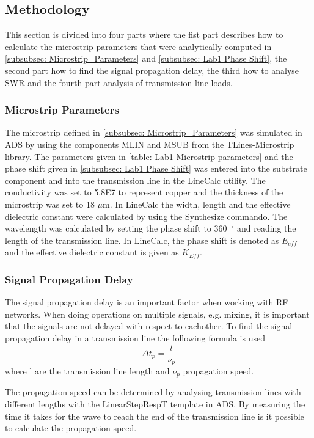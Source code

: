 \documentclass[report.tex]{subfiles}
\begin{document}
\subsection{Methodology}\label{sec:Lab1 methodology}
This section is divided into four parts where the fist part describes how to calculate the microstrip parameters that were analytically computed in \ref{subsubsec: Microstrip_Parameters} and \ref{subsubsec: Lab1 Phase Shift}, the second part how to find the signal propagation delay, the third how to analyse SWR and the fourth part analysis of transmission line loads.

\subsubsection{Microstrip Parameters}
The microstrip defined in \ref{subsubsec: Microstrip_Parameters} was simulated in ADS by using the components MLIN and MSUB from the TLines-Microstrip library. The parameters given in \ref{table: Lab1 Microstrip parameters} and the phase shift given in \ref{subsubsec: Lab1 Phase Shift} was entered into the substrate component and into the transmission line in the LineCalc utility. The conductivity was set to 5.8E7 to represent copper and the thickness of the microstrip was set to 18 $\mu$m. In LineCalc the width, length and the effective dielectric constant were calculated by using the Synthesize commando. The wavelength was calculated by setting the phase shift to 360~$^\circ$ and reading the length of the transmission line. In LineCalc, the phase shift is denoted as $E_{eff}$ and the effective dielectric constant is given as $K_{Eff}$.

\subsubsection{Signal Propagation Delay}
The signal propagation delay is an important factor when working with RF networks. When doing operations on multiple signals, e.g. mixing, it is important that the signals are not delayed with respect to eachother. To find the signal propagation delay in a transmission line the following formula is used
\begin{equation}\label{eq: Lab1 propagation delay}
	\Delta t_p = \dfrac{l}{\nu_p}
\end{equation}
where l are the transmission line length and $\nu_p$ propagation speed.

The propagation speed can be determined by analysing transmission lines with different lengths with the LinearStepRespT template in ADS. By measuring the time it takes for the wave to reach the end of the transmission line is it possible to calculate the propagation speed.
\end{document}
